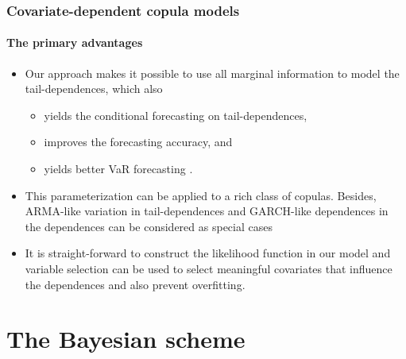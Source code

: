 \documentclass[10pt,aspectratio=43]{beamer}
\begin{document}
\begin{frame}
  \frametitle{Covariate-dependent copula models}
  \framesubtitle{The primary advantages}
  \begin{itemize}

  \item Our approach makes it possible to use all marginal information to model the
    tail-dependences, which also

    \begin{itemize}
    \item yields the conditional forecasting on tail-dependences,
    \item improves the forecasting accuracy, and
    \item yields better VaR forecasting \citep{huang2009estimating,siburg2015forecasting}.
    \end{itemize}


  \item This parameterization can be applied to a rich class of copulas. Besides,
    ARMA-like variation in tail-dependences \citep{patton2006modelling} and GARCH-like
    dependences in the dependences \citep{lucas2014conditional} can be considered as
    special cases

  \item It is straight-forward to construct the likelihood function in our model and
    variable selection can be used to select meaningful covariates that influence the
    dependences and also prevent overfitting.

  \end{itemize}
\end{frame}


\section{The Bayesian scheme}
\end{document}
